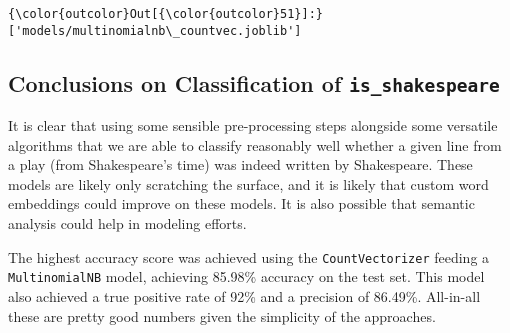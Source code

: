 \documentclass[11pt]{article}
\begin{document}
\begin{Verbatim}[commandchars=\\\{\}]
{\color{outcolor}Out[{\color{outcolor}51}]:} ['models/multinomialnb\_countvec.joblib']
\end{Verbatim}
            
    \subsection{\texorpdfstring{Conclusions on Classification of
\texttt{is\_shakespeare}}{Conclusions on Classification of is\_shakespeare}}\label{conclusions-on-classification-of-is_shakespeare}

It is clear that using some sensible pre-processing steps alongside some
versatile algorithms that we are able to classify reasonably well
whether a given line from a play (from Shakespeare's time) was indeed
written by Shakespeare. These models are likely only scratching the
surface, and it is likely that custom word embeddings could improve on
these models. It is also possible that semantic analysis could help in
modeling efforts.

The highest accuracy score was achieved using the
\texttt{CountVectorizer} feeding a \texttt{MultinomialNB} model,
achieving 85.98\% accuracy on the test set. This model also achieved a
true positive rate of 92\% and a precision of 86.49\%. All-in-all these
are pretty good numbers given the simplicity of the approaches.


    
    
    
    
\end{document}
